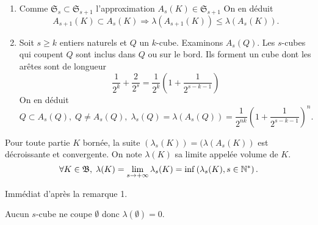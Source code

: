 \begin{rems}
 \begin{enumerate}
  \item Comme $\mathfrak{S}_s \subset \mathfrak{S}_{s+1}$ l'approximation $A_s(K)\in \mathfrak{S}_{s+1}$ On en déduit
\begin{displaymath}
 A_{s+1}(K) \subset A_s(K) \Rightarrow \lambda(A_{s+1}(K)) \leq \lambda(A_s(K)) .
\end{displaymath}
  \item Soit $s \geq k$ entiers naturels et $Q$ un $k$-cube. Examinons $A_s(Q)$.\newline
  Les $s$-cubes qui coupent $Q$ sont inclus dans $Q$ ou sur le bord. Ils forment un cube dont les arêtes sont de longueur
  \begin{displaymath}
    \frac{1}{2^k} + \frac{2}{2^s} = \frac{1}{2^k}\left( 1 + \frac{1}{2^{s-k-1}} \right)
  \end{displaymath}
  On en déduit
  \begin{displaymath}
   Q \subset A_s(Q), \; Q \neq A_s(Q), \; \lambda_s(Q) = \lambda(A_s(Q)) =  \frac{1}{2^{nk}}(1 + \frac{1}{2^{s-k-1}})^n.
  \end{displaymath}
 \end{enumerate}
\end{rems}

\begin{defi}
Pour toute partie $K$ bornée, la suite $(\lambda_s(K)) = (\lambda(A_s(K))$ est décroissante et convergente. On note $\lambda(K)$ sa limite appelée volume de $K$.
\begin{displaymath}
  \forall K \in \mathfrak{B}, \; \lambda(K) = \lim_{s\rightarrow +\infty} \lambda_s(K) = \inf\left( \lambda_s(K), s \in \mathbb{N}^*\right).
\end{displaymath}
\end{defi}
\begin{demo}
 Immédiat d'après la remarque 1.
\end{demo}
\begin{rem}
  Aucun $s$-cube ne coupe $\emptyset$ donc  $\lambda(\emptyset)=0$.
 \end{rem}

